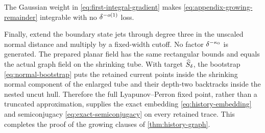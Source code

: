 The Gaussian weight in
\cref{eq:first-integral-gradient} makes
\cref{eq:appendix-growing-remainder} integrable with no
\(\delta^{-o(1)}\) loss.

Finally, extend the boundary state jets through degree three in the
unscaled normal distance and multiply by a fixed-width cutoff.  No factor
\(\delta^{-\kappa_0}\) is generated.  The prepared planar field has the
same rectangular bounds and equals the actual graph field on the shrinking
tube.  With target \(\widehat S_\delta\), the bootstrap
\cref{eq:normal-bootstrap} puts the retained current points inside the
shrinking normal component of the enlarged tube and their depth-two
backtracks inside the nested uncut hull.  Therefore the full
Lyapunov--Perron fixed point, rather than a truncated approximation, supplies
the exact embedding \cref{eq:history-embedding} and semiconjugacy
\cref{eq:exact-semiconjugacy} on every retained trace.  This completes the
proof of the growing clauses of \cref{thm:history-graph}.
